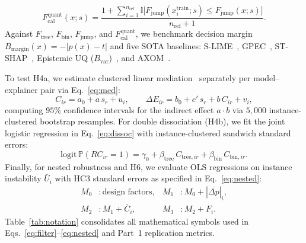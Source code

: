 \documentclass[conference]{IEEEtran}
\begin{document}
\begin{equation}
\label{eq:fcal}
F_{\mathrm{cal}}^{\mathrm{quant}}(x; s) = \frac{1 + \sum_{i=1}^{n_{\mathrm{ref}}} \mathbb{I}\big[F_{\mathrm{jump}}(x_i^{\mathrm{train}}; s) \le F_{\mathrm{jump}}(x; s)\big]}{n_{\mathrm{ref}} + 1}.
\end{equation}
Against $F_{\mathrm{tree}}$, $F_{\mathrm{bin}}$, $F_{\mathrm{jump}}$, and $F_{\mathrm{cal}}^{\mathrm{quant}}$, we benchmark decision margin $B_{\mathrm{margin}}(x) = -|p(x) - t|$ and five SOTA baselines: S-LIME~\cite{zhou2021}, GPEC~\cite{hill2024}, ST-SHAP~\cite{kelodjou2024}, Epistemic UQ ($B_{\mathrm{var}}$)~\cite{mikriukov2026}, and AXOM~\cite{pala2024}.

To test H4a, we estimate clustered linear mediation~\cite{preacher2008} separately per model--explainer pair via Eq.~\eqref{eq:med}:
\begin{equation}
\label{eq:med}
C_{ir} = a_0 + a\, s_r + u_i, \qquad \Delta E_{ir} = b_0 + c'\, s_r + b\, C_{ir} + v_i,
\end{equation}
computing $95\%$ confidence intervals for the indirect effect $a\cdot b$ via $5{,}000$ instance-clustered bootstrap resamples. For double dissociation (H4b), we fit the joint logistic regression in Eq.~\eqref{eq:dissoc} with instance-clustered sandwich standard errors:
\begin{equation}
\label{eq:dissoc}
\mathrm{logit}\,\mathbb{P}(RC_{ir} = 1) = \gamma_0 + \beta_{\mathrm{tree}}\, C_{\mathrm{tree},ir} + \beta_{\mathrm{bin}}\, C_{\mathrm{bin},ir}.
\end{equation}
Finally, for nested robustness and H6, we evaluate OLS regressions on instance instability $\bar{U}_i$ with HC3 standard errors as specified in Eq.~\eqref{eq:nested}:
\begin{equation}
\label{eq:nested}
\begin{aligned}
M_0 &: \text{design factors}, & M_1 &: M_0 + |\overline{\Delta p}|_i, \\
M_2 &: M_1 + \bar{C}_i, & M_3 &: M_2 + F_i.
\end{aligned}
\end{equation}
Table~\ref{tab:notation} consolidates all mathematical symbols used in Eqs.~\eqref{eq:filter}--\eqref{eq:nested} and Part~1 replication metrics.
\end{document}
